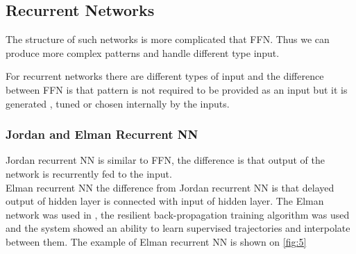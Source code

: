 \documentclass[12pt,a4paper]{report}
\begin{document}
			\subsection{Recurrent Networks}
				The structure of such networks is more complicated that FFN. Thus we can produce more complex patterns and handle different type input.
				
				For recurrent networks there are different types of input and the difference between FFN is that pattern is not required to be provided as an input but it is generated , tuned or chosen internally by the inputs. 
				
				\subsubsection{Jordan and Elman Recurrent NN}
					Jordan recurrent NN is similar to FFN, the difference is that output of the network is recurrently fed to the input.\\
					Elman recurrent NN the difference from Jordan recurrent NN is that delayed output of hidden layer is connected with input of hidden layer. The Elman network was used in \cite{berns1995neural}, the resilient back-propagation training algorithm was used and the system showed an ability to learn supervised trajectories and interpolate between them. The example of Elman recurrent NN is shown on \ref{fig:5} 
					
\end{document}
